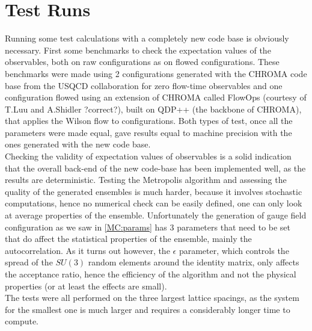 \section{Test Runs}
\label{sec:testautocorr}
Running some test calculations with a completely new code base is obviously necessary. First some benchmarks to check the expectation values of the observables, both on raw configurations as on flowed configurations. These benchmarks were made using 2 configurations generated with the CHROMA \cite{edwards_chroma_2005} code base from the USQCD collaboration for zero flow-time observables and one configuration flowed using an extension of CHROMA called FlowOps (courtesy of T.Luu and A.Shidler ?correct?), built on QDP++ (the backbone of CHROMA), that applies the Wilson flow to configurations. Both types of test, once all the parameters were made equal, gave results equal to machine precision with the ones generated with the new code base.\\
Checking the validity of expectation values of observables is a solid indication that the overall back-end of the new code-base has been implemented well, as the results are deterministic. Testing the Metropolis algorithm and assessing the quality of the generated ensembles is much harder, because it involves stochastic computations, hence no numerical check can be easily defined, one can only look at average properties of the ensemble. Unfortunately the generation of gauge field configuration as we saw in \cref{MC:params} has 3 parameters that need to be set that do affect the statistical properties of the ensemble, mainly the autocorrelation. As it turns out however, the $\epsilon$ parameter, which controls the spread of the $SU(3)$ random elements around the identity matrix, only affects the acceptance ratio, hence the efficiency of the algorithm and not the physical properties (or at least the effects are small).\\
The tests were all performed on the three largest lattice spacings, as the system for the smallest one is much larger and requires a considerably longer time to compute.

